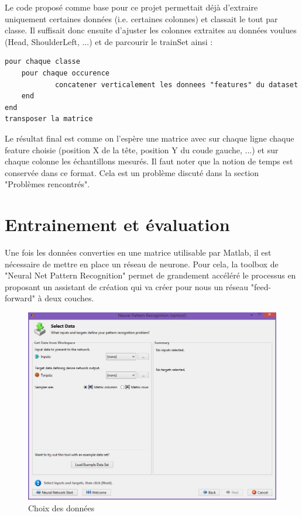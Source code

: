 Le code proposé comme base pour ce projet permettait déjà d'extraire uniquement certaines données (i.e. certaines colonnes) et classait le tout par classe. Il suffisait donc ensuite d'ajuster les colonnes extraites au données voulues (Head, ShoulderLeft, ...) et de parcourir le trainSet ainsi :

\begin{lstlisting}
pour chaque classe
	pour chaque occurence
    		concatener verticalement les donnees "features" du dataset
	end 
end
transposer la matrice 
\end{lstlisting}

Le résultat final est comme on l'espère une matrice avec sur chaque ligne chaque feature choisie (position X de la tête, position Y du coude gauche, ...) et sur chaque colonne les échantillons mesurés. Il faut noter que la notion de temps est conservée dans ce format. Cela est un problème discuté dans la section "Problèmes rencontrés". 

\section*{Entrainement et évaluation}

Une fois les données converties en une matrice utilisable par Matlab, il est nécessaire de mettre en place un réseau de neurone. Pour cela, la toolbox de "Neural Net Pattern Recognition" permet de grandement accéléré le processus en proposant un assistant de création qui va créer pour nous un réseau "feed-forward" à deux couches.

\begin{figure}[h]
  \centering
    \includegraphics[width=0.8\linewidth]{img/ann/train/ann_toolbox_1.jpg}
  \caption{Choix des données}
  \label{fig:toolbox_1}
\end{figure}

